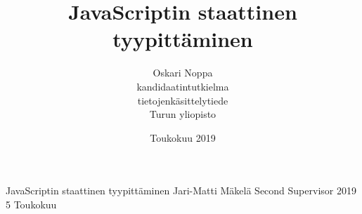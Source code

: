 \documentclass[a4paper, 12pt]{report}
\title{JavaScriptin staattinen tyypittäminen}
\author{Oskari Noppa \\kandidaatintutkielma \\ tietojenkäsittelytiede \\ Turun yliopisto}
\date{Toukokuu 2019}
\begin{document}
  \fintrue

  \iffin
  \renewcommand{\appname}{Liitteet}
  \else
  \renewcommand{\appname}{Appendices}
  \fi
  
  {JavaScriptin staattinen tyypittäminen}
  {Jari-Matti Mäkelä}
  {Second Supervisor}
  {2019}
  {5}
  {Toukokuu}
  
  
  \gentitle
  \pagestyle{empty}
  
  
\end{document}

